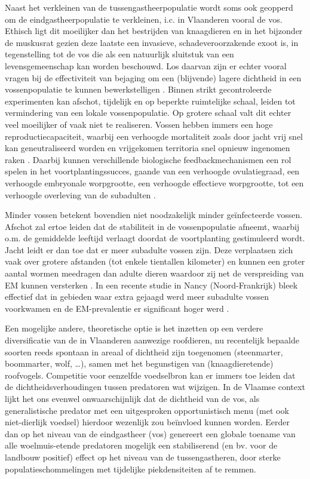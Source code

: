 \documentclass[twoside]{extreport}
\begin{document}
Naast het verkleinen van de tussengastheerpopulatie wordt soms ook
geopperd om de eindgastheerpopulatie te verkleinen, i.c. in Vlaanderen
vooral de vos. Ethisch ligt dit moeilijker dan het bestrijden van
knaagdieren en in het bijzonder de muskusrat gezien deze laatste een
invasieve, schadeveroorzakende exoot is, in tegenstelling tot de vos die
als een natuurlijk sluitstuk van een levensgemeenschap kan worden
beschouwd. Los daarvan zijn er echter vooral vragen bij de effectiviteit
van bejaging om een (blijvende) lagere dichtheid in een vossenpopulatie
te kunnen bewerkstelligen \citep{fauna2009advies}. Binnen strikt
gecontroleerde experimenten kan afschot, tijdelijk en op beperkte
ruimtelijke schaal, leiden tot vermindering van een lokale
vossenpopulatie. Op grotere schaal valt dit echter veel moeilijker of
vaak niet te realiseren. Vossen hebben immers een hoge
reproductiecapaciteit, waarbij een verhoogde mortaliteit zoals door
jacht vrij snel kan geneutraliseerd worden en vrijgekomen territoria
snel opnieuw ingenomen raken \citep{craig2017echinococcosis}. Daarbij
kunnen verschillende biologische feedbackmechanismen een rol spelen in
het voortplantingssucces, gaande van een verhoogde ovulatiegraad, een
verhoogde embryonale worpgrootte, een verhoogde effectieve worpgrootte,
tot een verhoogde overleving van de subadulten
\citep{marlow2016compensatory}.

Minder vossen betekent bovendien niet noodzakelijk minder geïnfecteerde
vossen. Afschot zal ertoe leiden dat de stabiliteit in de
vossenpopulatie afneemt, waarbij o.m. de gemiddelde leeftijd verlaagt
doordat de voortplanting gestimuleerd wordt. Jacht leidt er dan toe dat
er meer subadulte vossen zijn. Deze verplaatsen zich vaak over grotere
afstanden (tot enkele tientallen kilometer) en kunnen een groter aantal
wormen meedragen dan adulte dieren waardoor zij net de verspreiding van
EM kunnen versterken \citep{craig2017echinococcosis}. In een recente
studie in Nancy (Noord-Frankrijk) bleek effectief dat in gebieden waar
extra gejaagd werd meer subadulte vossen voorkwamen en de EM-prevalentie
er significant hoger werd \citep{comte2017echinococcus}.

Een mogelijke andere, theoretische optie is het inzetten op een verdere
diversificatie van de in Vlaanderen aanwezige roofdieren, nu recentelijk
bepaalde soorten reeds spontaan in areaal of dichtheid zijn toegenomen
(steenmarter, boommarter, wolf, \ldots{}), samen met het begunstigen van
(knaagdieretende) roofvogels. Competitie voor eenzelfde voedselbron kan
er immers toe leiden dat de dichtheidsverhoudingen tussen predatoren wat
wijzigen. In de Vlaamse context lijkt het ons evenwel onwaarschijnlijk
dat de dichtheid van de vos, als generalistische predator met een
uitgesproken opportunistisch menu (met ook niet-dierlijk voedsel)
hierdoor wezenlijk zou beïnvloed kunnen worden. Eerder dan op het niveau
van de eindgastheer (vos) genereert een globale toename van alle
woelmuis-etende predatoren mogelijk een stabiliserend (en bv. voor de
landbouw positief) effect op het niveau van de tussengastheren, door
sterke populatieschommelingen met tijdelijke piekdensiteiten af te
remmen.
\end{document}
